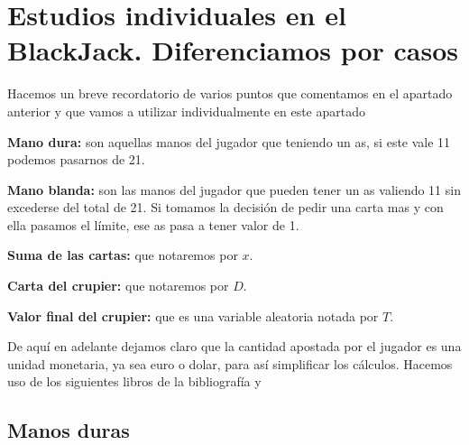 \documentclass[12pt,a4paper,]{book}
\title{}
\author{Nombre Completo Autor}
\date{18/11/2021}
\def\ifdoblecara{} %
\def\ifprincipal{} %
\let\ifprincipal\undefined %
\numberwithin{dummy}{section}
\theoremstyle{ocrenumbox}
\theoremstyle{blacknumex}
\theoremstyle{blacknumbox}
\theoremstyle{ocrenum}
\theoremstyle{ocrenum}
\begin{document}




\raggedbottom

\ifdefined\ifprincipal
\else
\setlength{\parindent}{1em}
\pagestyle{fancy}
\setcounter{tocdepth}{4}
\tableofcontents

\fi

\ifdefined\ifdoblecara
\fancyhead{}{}
\fancyhead[LE,RO]{\scriptsize\rightmark}
\fancyfoot[LO,RE]{\scriptsize\slshape \leftmark}
\fancyfoot[C]{}
\fancyfoot[LE,RO]{\footnotesize\thepage}
\else
\fancyhead{}{}
\fancyhead[RO]{\scriptsize\rightmark}
\fancyfoot[LO]{\scriptsize\slshape \leftmark}
\fancyfoot[C]{}
\fancyfoot[RO]{\footnotesize\thepage}
\fi

\renewcommand{\headrulewidth}{0.4pt}
\renewcommand{\footrulewidth}{0.4pt}

\hypertarget{Seccion4}{%
\chapter{Estudios individuales en el BlackJack. Diferenciamos por
casos}\label{Seccion4}}

Hacemos un breve recordatorio de varios puntos que comentamos en el
apartado anterior y que vamos a utilizar individualmente en este
apartado

\textbf{Mano dura:} son aquellas manos del jugador que teniendo un as,
si este vale 11 podemos pasarnos de 21.

\textbf{Mano blanda:} son las manos del jugador que pueden tener un as
valiendo 11 sin excederse del total de 21. Si tomamos la decisión de
pedir una carta mas y con ella pasamos el límite, ese as pasa a tener
valor de 1.

\textbf{Suma de las cartas:} que notaremos por \(x\).

\textbf{Carta del crupier:} que notaremos por \(D\).

\textbf{Valor final del crupier:} que es una variable aleatoria notada
por \(T\).

De aquí en adelante dejamos claro que la cantidad apostada por el
jugador es una unidad monetaria, ya sea euro o dolar, para así
simplificar los cálculos. Hacemos uso de los siguientes libros de la
bibliografía \citep{Libro10} y \citep{Libro18}

\hypertarget{Seccion41}{%
\section{Manos duras}\label{Seccion41}}
\end{document}
